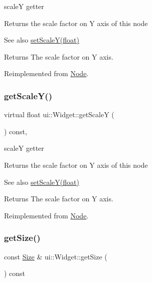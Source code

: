 scaleY getter 

Returns the scale factor on Y axis of this node

\begin{DoxySeeAlso}{See also}
{\ttfamily \hyperlink{classui_1_1Widget_acac2f88e6a4fb013377bc981a4a10c57}{set\+Scale\+Y(float)}}
\end{DoxySeeAlso}
\begin{DoxyReturn}{Returns}
The scale factor on Y axis. 
\end{DoxyReturn}


Reimplemented from \hyperlink{classNode_ab87661ab8940512baf2e7639ea55ff87}{Node}.

\mbox{\label{classui_1_1Widget_af9953371b66c5e1a608c5f7f009093fd}} 
\subsubsection{\texorpdfstring{get\+Scale\+Y()}{getScaleY()}\hspace{0.1cm}{\footnotesize\ttfamily [2/2]}}
{\footnotesize\ttfamily virtual float ui\+::\+Widget\+::get\+ScaleY (\begin{DoxyParamCaption}{ }\end{DoxyParamCaption}) const\hspace{0.3cm}{\ttfamily [override]}, {\ttfamily [virtual]}}



scaleY getter 

Returns the scale factor on Y axis of this node

\begin{DoxySeeAlso}{See also}
{\ttfamily \hyperlink{classui_1_1Widget_acac2f88e6a4fb013377bc981a4a10c57}{set\+Scale\+Y(float)}}
\end{DoxySeeAlso}
\begin{DoxyReturn}{Returns}
The scale factor on Y axis. 
\end{DoxyReturn}


Reimplemented from \hyperlink{classNode_ab87661ab8940512baf2e7639ea55ff87}{Node}.

\mbox{\label{classui_1_1Widget_ab6472f25eaef98668803f15623bf89cb}} 
\subsubsection{\texorpdfstring{get\+Size()}{getSize()}\hspace{0.1cm}{\footnotesize\ttfamily [1/2]}}
{\footnotesize\ttfamily const \hyperlink{classSize}{Size} \& ui\+::\+Widget\+::get\+Size (\begin{DoxyParamCaption}{ }\end{DoxyParamCaption}) const}

